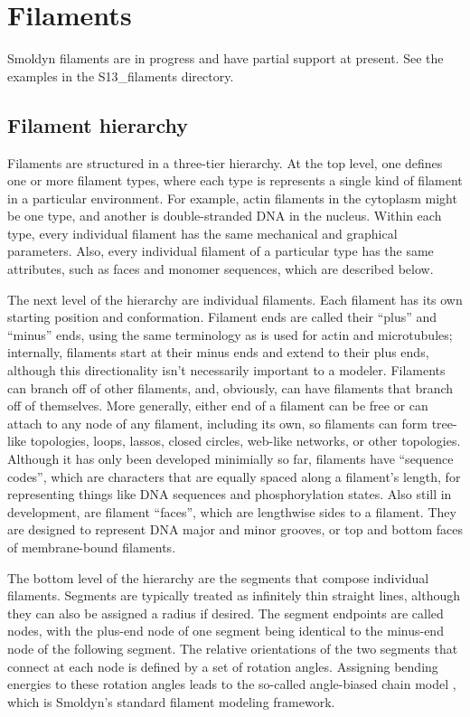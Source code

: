 \documentclass {scrbook}
\begin{document}
\chapter{Filaments}

Smoldyn filaments are in progress and have partial support at present. See the examples in the S13\_filaments directory.

\section{Filament hierarchy}

Filaments are structured in a three-tier hierarchy. At the top level, one defines one or more filament types, where each type is represents a single kind of filament in a particular environment. For example, actin filaments in the cytoplasm might be one type, and another is double-stranded DNA in the nucleus. Within each type, every individual filament has the same mechanical and graphical parameters. Also, every individual filament of a particular type has the same attributes, such as faces and monomer sequences, which are described below.

The next level of the hierarchy are individual filaments. Each filament has its own starting position and conformation. Filament ends are called their ``plus'' and ``minus'' ends, using the same terminology as is used for actin and microtubules; internally, filaments start at their minus ends and extend to their plus ends, although this directionality isn't necessarily important to a modeler. Filaments can branch off of other filaments, and, obviously, can have filaments that branch off of themselves. More generally, either end of a filament can be free or can attach to any node of any filament, including its own, so filaments can form tree-like topologies, loops, lassos, closed circles, web-like networks, or other topologies. Although it has only been developed minimially so far, filaments have ``sequence codes'', which are characters that are equally spaced along a filament's length, for representing things like DNA sequences and phosphorylation states. Also still in development, are filament ``faces'', which are lengthwise sides to a filament. They are designed to represent DNA major and minor grooves, or top and bottom faces of membrane-bound filaments.

The bottom level of the hierarchy are the segments that compose individual filaments. Segments are typically treated as infinitely thin straight lines, although they can also be assigned a radius if desired. The segment endpoints are called nodes, with the plus-end node of one segment being identical to the minus-end node of the following segment. The relative orientations of the two segments that connect at each node is defined by a set of rotation angles. Assigning bending energies to these rotation angles leads to the so-called angle-biased chain model \cite{Andrews_2014}, which is Smoldyn's standard filament modeling framework.
\end{document}
